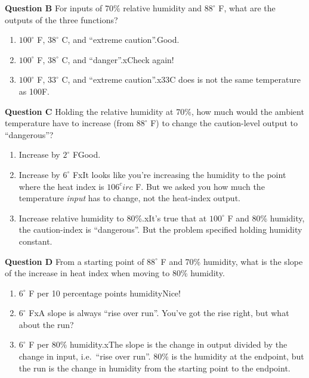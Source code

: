 \documentclass[
  letterpaper,
  DIV=11,
  numbers=noendperiod,
  oneside]{article}
\providecommand{\tightlist}{%
  \setlength{\itemsep}{0pt}\setlength{\parskip}{0pt}}\usepackage{longtable,booktabs,array}
\begin{document}
\begin{multicols}{2}
\textbf{Question B} For inputs of 70\% relative humidity and
\(88^{\circ}\) F, what are the outputs of the three functions?

\begin{enumerate}
\def\labelenumi{\roman{enumi}.}
\tightlist
\item
  {\(100^{\circ}\) F, \(38^\circ\) C, and ``extreme
  caution''.{Good.~}}\\
\item
  {\(100^\circ\) F, \(38^\circ\) C, and ``danger''.{xCheck again!}}\\
\item
  {\(100^\circ\) F, \(33^\circ\) C, and ``extreme caution''.{x33C does
  is not the same temperature as 100F.}}
\end{enumerate}

\textbf{Question C} Holding the relative humidity at 70\%, how much
would the ambient temperature have to increase (from \(88^\circ\) F) to
change the caution-level output to ``dangerous''?

\begin{enumerate}
\def\labelenumi{\roman{enumi}.}
\tightlist
\item
  {Increase by \(2^\circ\) F{Good.~}}\\
\item
  {Increase by \(6^\circ\) F{xIt looks like you're increasing the
  humidity to the point where the heat index is \(106^circ\) F. But we
  asked you how much the temperature \emph{input} has to change, not the
  heat-index output.}}\\
\item
  {Increase relative humidity to 80\%.{xIt's true that at
  \(100^\circ\) F and 80\% humidity, the caution-index is ``dangerous''.
  But the problem specified holding humidity constant.}}
\end{enumerate}

\textbf{Question D} From a starting point of \(88^\circ\) F and 70\%
humidity, what is the slope of the increase in heat index when moving to
80\% humidity.

\begin{enumerate}
\def\labelenumi{\roman{enumi}.}
\tightlist
\item
  {\(6^\circ\) F per 10 percentage points humidity{Nice!~}}\\
\item
  {\(6^\circ\) F{xA slope is always ``rise over run''. You've got the
  rise right, but what about the run?}}\\
\item
  {\(6^\circ\) F per 80\% humidity.{xThe slope is the change in output
  divided by the change in input, i.e.~``rise over run''. 80\% is the
  humidity at the endpoint, but the run is the change in humidity from
  the starting point to the endpoint.}}
\end{enumerate}


\end{multicols}
\end{document}
